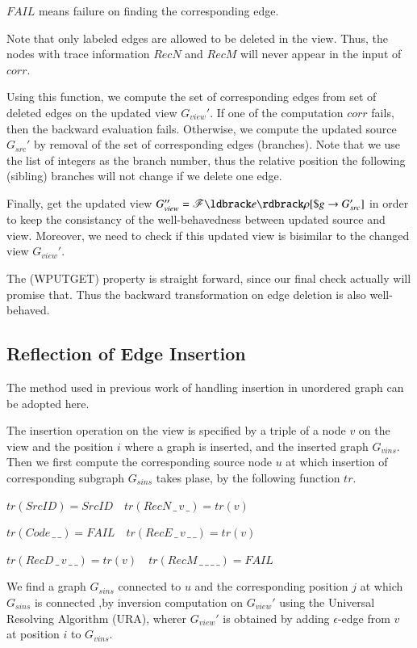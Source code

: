 \documentclass{llncs}
\begin{document}
$FAIL$ means failure on finding the corresponding edge.

Note that only labeled edges are allowed to be deleted in the view. Thus, the nodes with trace information $RecN$ and $RecM$ will never appear in the input of $corr$.

Using this function, we compute the set of corresponding edges from set of deleted edges on the updated view $G_{view}'$. If one of the computation $corr$ fails, then the backward evaluation fails. Otherwise, we compute the updated source $G_{src}'$ by removal of the set of corresponding edges (branches). Note that we use the list of integers as the branch number, thus the relative position the following (sibling) branches will not change if we delete one edge.

Finally, get the updated view $G_{view}''=\mathscr{F}\ldbrack e\rdbrack\rho[\$g\rightarrow G_{src}']$ in order to keep the consistancy of the well-behavedness between updated source and view. Moreover, we need to check if this updated view is bisimilar to the changed view $G_{view}'$.

The (WPUTGET) property is straight forward, since our final check actually will promise that. Thus the backward transformation on edge deletion is also well-behaved.

\subsection{Reflection of Edge Insertion}\label{subsec:bak-ins}

The method used in previous work of handling insertion in unordered graph can be adopted here.

The insertion operation on the view is specified by a triple of a node $v$ on the view and the position $i$ where a graph is inserted, and the inserted graph $G_{vins}$. Then we first compute the corresponding source node $u$ at which insertion of corresponding subgraph $G_{sins}$ takes plase, by the following function $tr$.

$tr(SrcID)=SrcID\quad tr(RecN\,\_\,v\,\_)=tr(v)$

$tr(Code\,\_\,\_)=FAIL\quad tr(RecE\,\_\,v\,\_\,\_)=tr(v)$

$tr(RecD\,\_\,v\,\_\,\_)=tr(v)\quad tr(RecM\,\_\,\_\,\_\,\_)=FAIL$

We find a graph $G_{sins}$ connected to $u$ and the corresponding position $j$ at which $G_{sins}$ is connected ,by inversion computation on $G_{view}'$ using the Universal Resolving Algorithm (URA), wherer $G_{view}'$ is obtained by adding $\epsilon$-edge from $v$ at position $i$ to $G_{vins}$.
\end{document}

